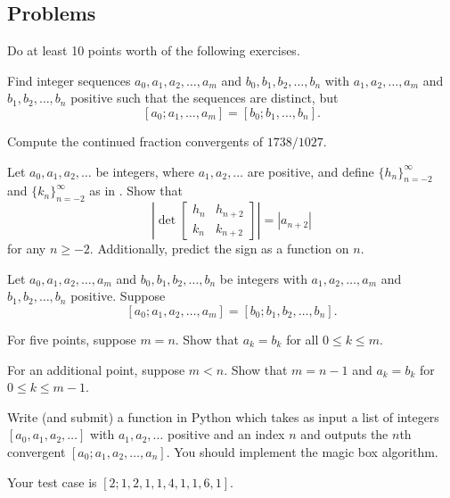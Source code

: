 \documentclass[../notes.tex]{subfiles}
\begin{document}
\subsection{Problems}
Do at least 10 points worth of the following exercises.
\begin{prob}[1 point]
	Find integer sequences $a_0,a_1,a_2,\ldots,a_m$ and $b_0,b_1,b_2,\ldots,b_n$ with $a_1,a_2,\ldots,a_m$ and $b_1,b_2,\ldots,b_n$ positive such that the sequences are distinct, but
	\[[a_0;a_1,\ldots,a_m]=[b_0;b_1,\ldots,b_n].\]
\end{prob}
\begin{prob}[2 points]
	Compute the continued fraction convergents of $1738/1027$.
\end{prob}
\begin{prob}[3 points]
	Let $a_0,a_1,a_2,\ldots$ be integers, where $a_1,a_2,\ldots$ are positive, and define $\{h_n\}_{n=-2}^\infty$ and $\{k_n\}_{n=-2}^\infty$ as in . Show that
	\[\left|\det\begin{bmatrix}
		h_n & h_{n+2} \\
		k_n & k_{n+2}
	\end{bmatrix}\right|=\left|a_{n+2}\right|\]
	for any $n\ge-2$. Additionally, predict the sign as a function on $n$.
\end{prob}
\begin{prob}[5 or 6 points]
	Let $a_0,a_1,a_2,\ldots,a_m$ and $b_0,b_1,b_2,\ldots,b_n$ be integers with $a_1,a_2,\ldots,a_m$ and $b_1,b_2,\ldots,b_n$ positive. Suppose
	\[[a_0;a_1,a_2,\ldots,a_m]=[b_0;b_1,b_2,\ldots,b_n].\]
	\begin{listalph}
		\item For five points, suppose $m=n$. Show that $a_k=b_k$ for all $0\le k\le m$.
		\item For an additional point, suppose $m<n$. Show that $m=n-1$ and $a_k=b_k$ for $0\le k\le m-1$.
	\end{listalph}
\end{prob}
\begin{prob}[5 points]
	Write (and submit) a function in Python which takes as input a list of integers $[a_0,a_1,a_2,\ldots]$ with $a_1,a_2,\ldots$ positive and an index $n$ and outputs the $n$th convergent $[a_0;a_1,a_2,\ldots,a_n]$. You should implement the magic box algorithm.
	
	Your test case is $[2;1,2,1,1,4,1,1,6,1]$.
\end{prob}
\end{document}
